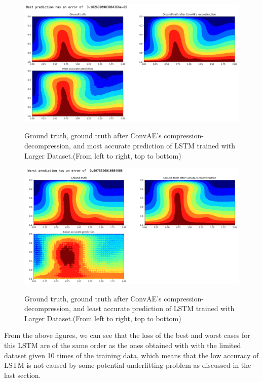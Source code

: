 \begin{figure}[H]
    \caption{Ground truth, ground truth after ConvAE's compression-decompression, and most accurate prediction of LSTM trained with Larger Dataset.(From left to right, top to bottom)}
    \includegraphics[scale=0.5]{figures/mantle_convection_images/larger_dataset/LSTM_Best.png}
    \label{figure:LSTM_larger_best}
\end{figure}

\begin{figure}[H]
    \caption{Ground truth, ground truth after ConvAE's compression-decompression, and least accurate prediction of LSTM trained with Larger Dataset.(From left to right, top to bottom)}
    \includegraphics[scale=0.5]{figures/mantle_convection_images/larger_dataset/LSTM_Worst.png}
    \label{figure:LSTM_larger_worst}
\end{figure}


From the above figures, we can see that the loss of the best and worst cases for this LSTM are of the same order as the ones obtained with with the limited dataset given 10 times of the training data, which means that the low accuracy of LSTM is not caused by some potential underfitting problem as discussed in the last section.

